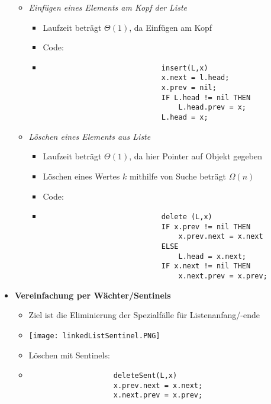 \begin{itemize}
\begin{itemize}
                \item \textit{Einfügen eines Elements am Kopf der Liste} 
                    \begin{itemize}
                        \item Laufzeit beträgt $\Theta(1)$, da Einfügen am Kopf 
                        \item Code:
                        \item[] 
                            \begin{verbatim}
                            insert(L,x)
                            x.next = l.head;
                            x.prev = nil;
                            IF L.head != nil THEN 
                                L.head.prev = x;
                            L.head = x;
                            \end{verbatim}
                    \end{itemize}

                \item \textit{Löschen eines Elements aus Liste}
                    \begin{itemize}
                        \item Laufzeit beträgt $\Theta(1)$, da hier Pointer auf Objekt gegeben
                        \item[] Löschen eines Wertes $k$ mithilfe von Suche beträgt $\Omega(n)$
                        \item Code:
                        \item[]
                            \begin{verbatim}
                            delete (L,x)
                            IF x.prev != nil THEN
                                x.prev.next = x.next
                            ELSE 
                                L.head = x.next;
                            IF x.next != nil THEN
                                x.next.prev = x.prev;
                            \end{verbatim} 
                    \end{itemize}
            \end{itemize}

        \item \textbf{Vereinfachung per Wächter/Sentinels}
            \begin{itemize}
                \item Ziel ist die Eliminierung der Spezialfälle für Listenanfang/-ende 
                \item[] \texttt{[image: linkedListSentinel.PNG]}
                \item Löschen mit Sentinels:
                \item[]
                    \begin{verbatim}
                    deleteSent(L,x)
                    x.prev.next = x.next;
                    x.next.prev = x.prev;
                    \end{verbatim}
            \end{itemize}
    \end{itemize}

